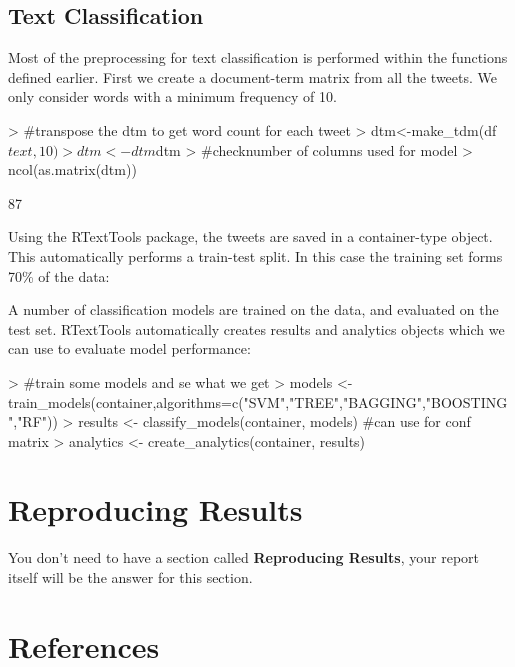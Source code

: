 \documentclass[10pt]{article}
\begin{document}
\subsection{Text Classification}
Most of the preprocessing for text classification is performed within the functions defined earlier. First we create a document-term matrix from all the tweets. We only consider words with a minimum frequency of 10. 

\begin{Schunk}
\begin{Sinput}
> #transpose the dtm to get word count for each tweet
> dtm<-make_tdm(df$text,10)
> dtm<-dtm$dtm
> #checknumber of columns used for model
> ncol(as.matrix(dtm))
\end{Sinput}
\begin{Soutput}
[1] 87
\end{Soutput}
\end{Schunk}
Using the RTextTools package, the tweets are saved in a container-type object. This automatically performs a train-test split. In this case the training set forms 70\% of the data:
\begin{Schunk}
\end{Schunk}
A number of classification models are trained on the data, and evaluated on the test set. RTextTools automatically creates results and analytics objects which we can use to evaluate model performance:
\begin{Schunk}
\begin{Sinput}
> #train some models and se what we get
> models <- train_models(container,algorithms=c("SVM","TREE","BAGGING","BOOSTING","RF"))
> results <- classify_models(container, models) #can use for conf matrix
> analytics <- create_analytics(container, results)
\end{Sinput}
\end{Schunk}


\section{Reproducing Results}

You don't need to have a section called \textbf{Reproducing Results}, your report itself will be the answer for this section. 



\clearpage

\section{References}\label{pubs}

\printbibliography[heading =none]


\clearpage
\end{document}
